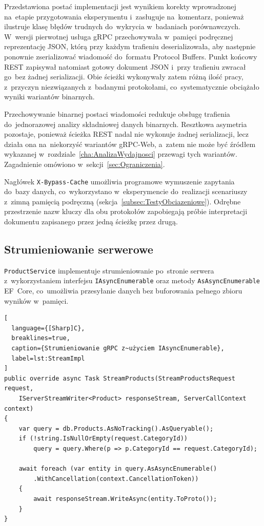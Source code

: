 Przedstawiona postać implementacji jest wynikiem korekty wprowadzonej na~etapie przygotowania eksperymentu i~zasługuje na~komentarz, ponieważ ilustruje klasę błędów trudnych do~wykrycia w~badaniach porównawczych. W~wersji pierwotnej usługa gRPC przechowywała w~pamięci podręcznej reprezentację JSON, którą przy każdym trafieniu deserializowała, aby następnie ponownie zserializować wiadomość do~formatu Protocol Buffers. Punkt końcowy REST zapisywał natomiast gotowy dokument JSON i~przy trafieniu zwracał go~bez żadnej serializacji. Obie ścieżki wykonywały zatem różną ilość pracy, z~przyczyn niezwiązanych z~badanymi protokołami, co~systematycznie obciążało wyniki wariantów binarnych.

Przechowywanie binarnej postaci wiadomości redukuje obsługę trafienia do~jednorazowej analizy składniowej danych binarnych. Resztkowa asymetria pozostaje, ponieważ ścieżka REST nadal nie wykonuje żadnej serializacji, lecz działa ona na~niekorzyść wariantów gRPC-Web, a~zatem nie może być źródłem wykazanej w~rozdziale~\ref{cha:AnalizaWydajnosci} przewagi tych wariantów. Zagadnienie omówiono w~sekcji~\ref{sec:Ograniczenia}.

Nagłówek \texttt{X-Bypass-Cache} umożliwia programowe wymuszenie zapytania do~bazy danych, co~wykorzystano w~eksperymencie do~realizacji scenariuszy z~zimną pamięcią podręczną (sekcja~\ref{subsec:TestyObciazeniowe}). Odrębne przestrzenie nazw kluczy dla obu protokołów zapobiegają próbie interpretacji dokumentu zapisanego przez jedną ścieżkę przez drugą.

\subsection{Strumieniowanie serwerowe}
\label{subsec:StreamingImpl}

\texttt{ProductService} implementuje strumieniowanie po~stronie serwera z~wykorzystaniem interfejsu \texttt{IAsyncEnumerable} oraz metody \texttt{AsAsyncEnumerable} EF~Core, co~umożliwia przesyłanie danych bez buforowania pełnego zbioru wyników w~pamięci.

\begin{lstlisting}[
  language={[Sharp]C},
  breaklines=true,
  caption={Strumieniowanie gRPC z~użyciem IAsyncEnumerable},
  label=lst:StreamImpl
]
public override async Task StreamProducts(StreamProductsRequest request,
    IServerStreamWriter<Product> responseStream, ServerCallContext context)
{
    var query = db.Products.AsNoTracking().AsQueryable();
    if (!string.IsNullOrEmpty(request.CategoryId))
        query = query.Where(p => p.CategoryId == request.CategoryId);

    await foreach (var entity in query.AsAsyncEnumerable()
        .WithCancellation(context.CancellationToken))
    {
        await responseStream.WriteAsync(entity.ToProto());
    }
}
\end{lstlisting}

